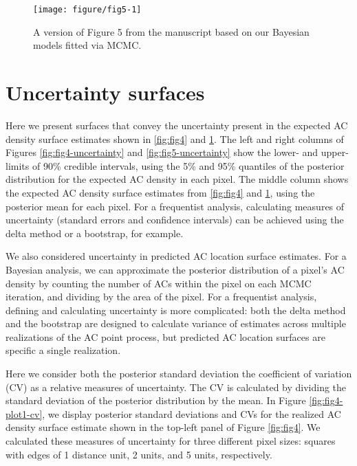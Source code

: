 \documentclass[10pt,a4paper]{article}\usepackage[]{graphicx}\usepackage[]{xcolor}
\makeatletter
\def\maxwidth{ %
  \ifdim\Gin@nat@width>\linewidth
    \linewidth
  \else
    \Gin@nat@width
  \fi
}
\newenvironment{knitrout}{}{} %
\makeatother
\begin{document}
\begin{knitrout}
\color{fgcolor}\begin{figure}
\texttt{[image: figure/fig5-1]} \caption[A version of Figure 5 from the manuscript based on our Bayesian models fitted via MCMC]{A version of Figure 5 from the manuscript based on our Bayesian models fitted via MCMC.}\label{fig:fig5}
\end{figure}

\end{knitrout}

\section{Uncertainty surfaces}
\label{sec:uncertainty}

Here we present surfaces that convey the uncertainty present in the
expected AC density surface estimates shown in \ref{fig:fig4} and
\ref{fig:fig5}. The left and right columns of Figures
\ref{fig:fig4-uncertainty} and \ref{fig:fig5-uncertainty} show the
lower- and upper-limits of 90\% credible intervals, using the 5\% and
95\% quantiles of the posterior distribution for the expected AC
density in each pixel. The middle column shows the expected AC density
surface estimates from \ref{fig:fig4} and \ref{fig:fig5}, using the
posterior mean for each pixel. For a frequentist analysis, calculating
measures of uncertainty (standard errors and confidence intervals) can
be achieved using the delta method or a bootstrap, for example.

We also considered uncertainty in predicted AC location surface
estimates. For a Bayesian analysis, we can approximate the posterior
distribution of a pixel's AC density by counting the number
of ACs within the pixel on each MCMC iteration, and dividing by the
area of the pixel. For a frequentist analysis, defining and
calculating uncertainty is more complicated: both the delta method and
the bootstrap are designed to calculate variance of estimates across
multiple realizations of the AC point process, but predicted AC location
surfaces are specific a single realization.

Here we consider both the posterior standard deviation the coefficient
of variation (CV) as a relative measures of uncertainty. The CV is
calculated by dividing the standard deviation of the posterior
distribution by the mean. In Figure \ref{fig:fig4-plot1-cv}, we
display posterior standard deviations and CVs for the realized AC
density surface estimate shown in the top-left panel of Figure
\ref{fig:fig4}. We calculated these measures of uncertainty for three
different pixel sizes: squares with edges of 1 distance unit, 2 units,
and 5 units, respectively.
\end{document}
